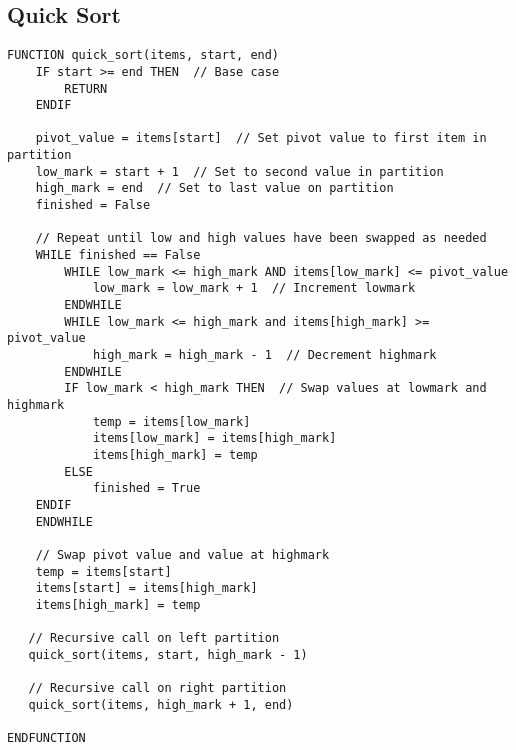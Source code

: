 \documentclass[a4paper,11pt]{article}
\begin{document}
\subsection{Quick Sort}
\begin{Verbatim}[breaklines=true, breakanywhere=true]
FUNCTION quick_sort(items, start, end)
    IF start >= end THEN  // Base case
        RETURN
    ENDIF
    
    pivot_value = items[start]  // Set pivot value to first item in partition
    low_mark = start + 1  // Set to second value in partition
    high_mark = end  // Set to last value on partition
    finished = False
    
    // Repeat until low and high values have been swapped as needed
    WHILE finished == False
        WHILE low_mark <= high_mark AND items[low_mark] <= pivot_value
            low_mark = low_mark + 1  // Increment lowmark
        ENDWHILE
        WHILE low_mark <= high_mark and items[high_mark] >= pivot_value
            high_mark = high_mark - 1  // Decrement highmark
        ENDWHILE
        IF low_mark < high_mark THEN  // Swap values at lowmark and highmark
            temp = items[low_mark]
            items[low_mark] = items[high_mark]
            items[high_mark] = temp
        ELSE
            finished = True
	ENDIF
    ENDWHILE 
    
    // Swap pivot value and value at highmark
    temp = items[start]
    items[start] = items[high_mark]
    items[high_mark] = temp
    
   // Recursive call on left partition
   quick_sort(items, start, high_mark - 1)
    
   // Recursive call on right partition
   quick_sort(items, high_mark + 1, end)
    
ENDFUNCTION
\end{Verbatim}
\end{document}

